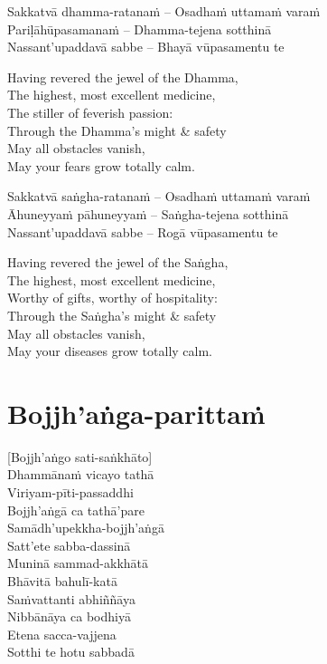 Sakkatvā dhamma-ratanaṁ – Osadhaṁ uttamaṁ varaṁ\\
Pariḷāhūpasamanaṁ – Dhamma-tejena sotthinā\\
Nassant'upaddavā sabbe – Bhayā vūpasamentu te

\begin{english}
  Having revered the jewel of the Dhamma,\\
  The highest, most excellent medicine,\\
  The stiller of feverish passion:\\
  Through the Dhamma's might \& safety\\
  May all obstacles vanish,\\
  May your fears grow totally calm.
\end{english}

Sakkatvā saṅgha-ratanaṁ – Osadhaṁ uttamaṁ varaṁ\\
Āhuneyyaṁ pāhuneyyaṁ – Saṅgha-tejena sotthinā\\
Nassant'upaddavā sabbe – Rogā vūpasamentu te

\begin{english}
  Having revered the jewel of the Saṅgha,\\
  The highest, most excellent medicine,\\
  Worthy of gifts, worthy of hospitality:\\
  Through the Saṅgha's might \& safety\\
  May all obstacles vanish,\\
  May your diseases grow totally calm.
\end{english}

\suttaRef{[MJG]}

\section{Bojjh'aṅga-parittaṁ}
\label{bojjhana-parittam}
[Bojjh'aṅgo sati-saṅkhāto]\\
Dhammānaṁ vicayo tathā\\
Viriyam-pīti-passaddhi\\
Bojjh'aṅgā ca tathā'pare\\
Samādh'upekkha-bojjh'aṅgā\\
Satt'ete sabba-dassinā\\
Muninā sammad-akkhātā\\
Bhāvitā bahulī-katā\\
Saṁvattanti abhiññāya\\
Nibbānāya ca bodhiyā\\
Etena sacca-vajjena\\
Sotthi te hotu sabbadā

